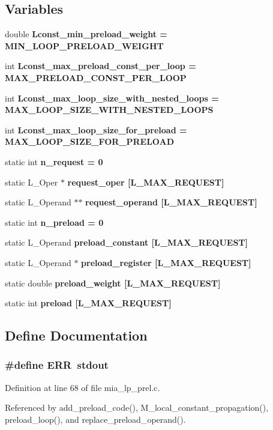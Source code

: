 \subsection*{Variables}
\begin{CompactItemize}
\item 
double \bf{Lconst\_\-min\_\-preload\_\-weight} = MIN\_\-LOOP\_\-PRELOAD\_\-WEIGHT
\item 
int \bf{Lconst\_\-max\_\-preload\_\-const\_\-per\_\-loop} = MAX\_\-PRELOAD\_\-CONST\_\-PER\_\-LOOP
\item 
int \bf{Lconst\_\-max\_\-loop\_\-size\_\-with\_\-nested\_\-loops} = MAX\_\-LOOP\_\-SIZE\_\-WITH\_\-NESTED\_\-LOOPS
\item 
int \bf{Lconst\_\-max\_\-loop\_\-size\_\-for\_\-preload} = MAX\_\-LOOP\_\-SIZE\_\-FOR\_\-PRELOAD
\item 
static int \bf{n\_\-request} = 0
\item 
static L\_\-Oper $\ast$ \bf{request\_\-oper} [L\_\-MAX\_\-REQUEST]
\item 
static L\_\-Operand $\ast$$\ast$ \bf{request\_\-operand} [L\_\-MAX\_\-REQUEST]
\item 
static int \bf{n\_\-preload} = 0
\item 
static L\_\-Operand \bf{preload\_\-constant} [L\_\-MAX\_\-REQUEST]
\item 
static L\_\-Operand $\ast$ \bf{preload\_\-register} [L\_\-MAX\_\-REQUEST]
\item 
static double \bf{preload\_\-weight} [L\_\-MAX\_\-REQUEST]
\item 
static int \bf{preload} [L\_\-MAX\_\-REQUEST]
\end{CompactItemize}


\subsection{Define Documentation}
\subsubsection{\setlength{\rightskip}{0pt plus 5cm}\#define \bf{ERR}~stdout}\label{mia__lp__prel_8c_735563036dced0b7d6cc98f97ea4978b}




Definition at line 68 of file mia\_\-lp\_\-prel.c.

Referenced by add\_\-preload\_\-code(), M\_\-local\_\-constant\_\-propagation(), preload\_\-loop(), and replace\_\-preload\_\-operand().
